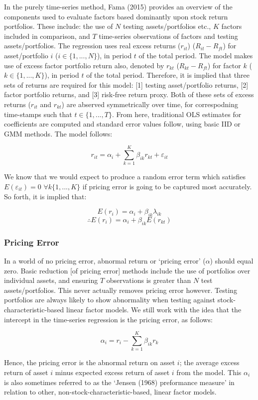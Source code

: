 \documentclass[11pt, english]{article}
\begin{document}
	In the purely time-series method, Fama (2015) provides an overview of the components used to evaluate factors based dominantly upon stock return portfolios. These include: the use of $N$ testing assets/portfolios etc., $K$ factors included in comparison, and $T$ time-series observations of factors and testing assets/portfolios. The regression uses real excess returns ($r_{it}$) ($R_{it}-R_{ft}$) for asset/portfolio $i$ ($i\in\{1,...,N\}$), in period $t$ of the total period. The model makes use of excess factor portfolio return also, denoted by $r_{kt}$ ($R_{kt}-R_{ft}$) for factor $k$ ($k\in\{1,...,K\}$), in period $t$ of the total period. Therefore, it is implied that three sets of returns are required for this model: [1] testing asset/portfolio returns, [2] factor portfolio returns, and [3] risk-free return proxy. Both of these sets of excess returns ($r_{it}$ and $r_{kt}$) are abserved symmetrically over time, for correspodning time-stamps such that $t\in\{1,...,T\}$. From here, traditional OLS estimates for coefficients are computed and standard error values follow, using basic IID or GMM methods. The model follows:

	$$r_{it}=\alpha_i+\sum_{k=1}^K\beta_{ik}r_{kt}+\varepsilon_{it}$$

	We know that we would expect to produce a random error term which satisfies $E(\varepsilon_{it})=0$ $\forall k\{1,...,K\}$ if pricing error is going to be captured most accurately. So forth, it is implied that:

	$$E(r_i)=\alpha_i+\beta_{ik}\lambda_{ik}$$
	$$\therefore E(r_i)=\alpha_i+\beta_{ik}E(r_{kt})$$

		\subsubsection*{Pricing Error}

	In a world of no pricing error, abnormal return or `pricing error' ($\alpha$) should equal zero. Basic reduction [of pricing error] methods include the use of portfolios over individual assets, and ensuring $T$ observations is greater than $N$ test assets/portfolios. This never actually removes pricing error however. Testing portfolios are always likely to show abnormality when testing against stock-characteristic-based linear factor models. We still work with the idea that the intercept in the time-series regression is the pricing error, as follows: 

	$$\alpha_i=r_i-\sum_{k=1}^K\beta_{ik}r_k$$

	Hence, the pricing error is the abnormal return on asset $i$; the average excess return of asset $i$ minus expected excess return of asset $i$ from the model. This $\alpha_i$ is also sometimes referred to as the `Jensen (1968) preformance measure' in relation to other, non-stock-characteristic-based, linear factor models.
\end{document}
